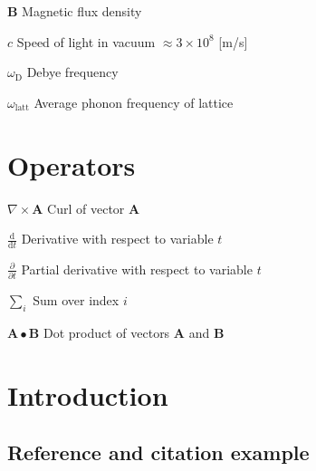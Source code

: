 \documentclass[12pt, a4paper, oneside]{article}
\begin{document}
\begin{abbreviations}
    \item [$\mathbf{B}$]                Magnetic flux density
    \item [$c$]                         Speed of light in vacuum $\approx 3\times10^8$ [m/s]
    \item [$\omega_{\mathrm{D}}$]       Debye frequency
    \item [$\omega_{\mathrm{latt}}$]    Average phonon frequency of lattice
\end{abbreviations}

\section*{Operators}

\begin{abbreviations}
    \item [$\nabla \times \mathbf{A}$]                    Curl of vector $\mathbf{A}$
    \item [$\displaystyle\frac{\mbox{d}}{\mbox{d} t}$]    Derivative with respect to variable $t$
    \item [$\displaystyle\frac{\partial}{\partial t}$]    Partial derivative with respect to variable $t$
    \item [$\sum_i $]                                     Sum over index $i$
    \item [$\mathbf{A} \bullet \mathbf{B}$]               Dot product of vectors $\mathbf{A}$ and $\mathbf{B}$
\end{abbreviations}

\cleardoublepage


\setcounter{page}{1}
\onehalfspacing

\section{Introduction} \label{sec:intro}


\blindtext
\blinditemize
\blindtext

\subsection{Reference and citation example} \label{subsec:reference-and-citation-example}
\end{document}
